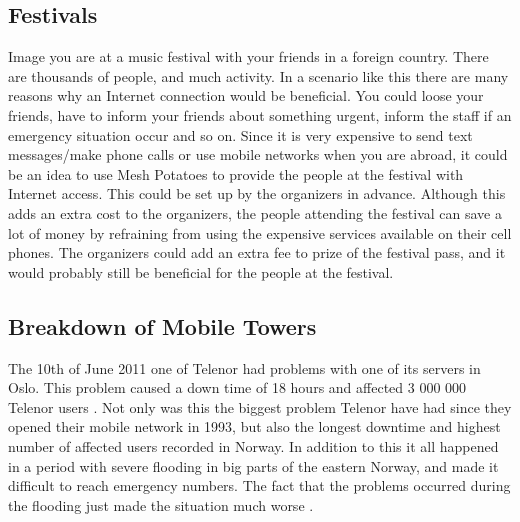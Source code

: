 \subsection{Festivals}
Image you are at a music festival with your friends in a foreign country. There are thousands of people, and much activity. In a scenario like this there are many reasons why an Internet connection would be beneficial. You could loose your friends, have to inform your friends about something urgent, inform the staff if an emergency situation occur and so on. Since it is very expensive to send text messages/make phone calls or use mobile networks when you are abroad, it could be an idea to use Mesh Potatoes to provide the people at the festival with Internet access. This could be set up by the organizers in advance. Although this adds an extra cost to the organizers, the people attending the festival can save a lot of money by refraining from using the expensive services available on their cell phones. The organizers could add an extra fee to prize of the festival pass, and it would probably still be beneficial for the people at the festival. 

\subsection{Breakdown of Mobile Towers}

The 10th of June 2011 one of Telenor had problems with one of its servers in Oslo. This problem caused a down time of 18 hours and affected 3 000 000 Telenor users \cite{listeNedetid}. Not only was this the biggest problem Telenor have had since they opened their mobile network in 1993, but also the longest downtime and highest number of affected users recorded in Norway. In addition to this it all happened in a period with severe flooding in big parts of the eastern Norway, and made it difficult to reach emergency numbers. The fact that the problems occurred during the flooding just made the situation much worse \cite{TelenorNede}.
